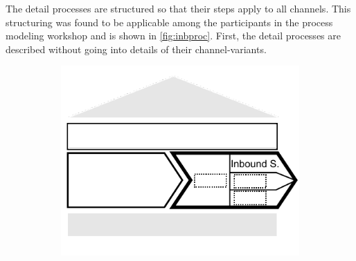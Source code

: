 	 The detail processes are structured so that their steps apply to all channels. This structuring was found to be applicable among the participants in the process modeling workshop and is shown in \Fig \ref{fig:inbproc}. First, the detail processes are described without going into details of their channel-variants. 
	 
	 \begin{figure}[caption={Inbound service process}, label={fig:inbproc}]
	 	\begin{subfigure}[b]{.45\textwidth}
	 		\begin{center}
	 			\includegraphics{figures/processes/inbound.pdf}
	 		\end{center}
	 	\end{subfigure}
	 	\begin{subfigure}[b]{.45\textwidth}
	 		\begin{center}
	 		\end{center}
	 	\end{subfigure}
	 	
	 \end{figure}
	 
